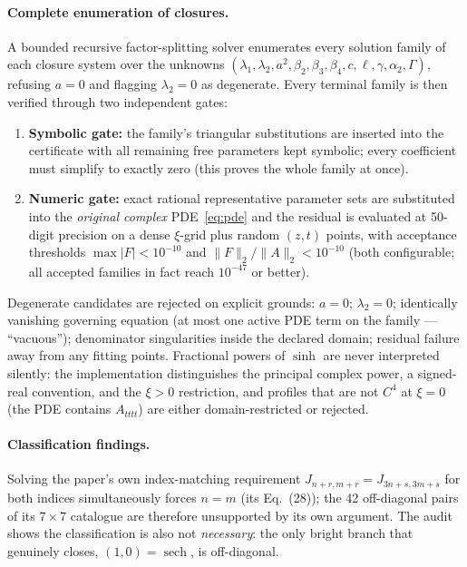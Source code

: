 \documentclass[11pt,a4paper]{article}
\begin{document}
\paragraph{Complete enumeration of closures.}
A bounded recursive factor-splitting solver enumerates every solution family
of each closure system over the unknowns
$(\lambda_1,\lambda_2,a^2,\beta_2,\beta_3,\beta_4,c,\ell,\gamma,\alpha_2,\Gamma)$,
refusing $a=0$ and flagging $\lambda_2=0$ as degenerate. Every terminal family
is then verified through two independent gates:
\begin{enumerate}
\item \textbf{Symbolic gate:} the family's triangular substitutions are
inserted into the certificate with all remaining free parameters kept
symbolic; every coefficient must simplify to exactly zero (this proves the
whole family at once).
\item \textbf{Numeric gate:} exact rational representative parameter sets are
substituted into the \emph{original complex} PDE~\eqref{eq:pde} and the
residual is evaluated at 50-digit precision on a dense $\xi$-grid plus random
$(z,t)$ points, with acceptance thresholds
$\max|F|<10^{-10}$ and $\|F\|_2/\|A\|_2<10^{-10}$ (both configurable; all
accepted families in fact reach $10^{-47}$ or better).
\end{enumerate}
Degenerate candidates are rejected on explicit grounds: $a=0$;
$\lambda_2=0$; identically vanishing governing equation (at most one active
PDE term on the family --- ``vacuous''); denominator singularities inside the
declared domain; residual failure away from any fitting points. Fractional
powers of $\sinh$ are never interpreted silently: the implementation
distinguishes the principal complex power, a signed-real convention, and the
$\xi>0$ restriction, and profiles that are not $C^4$ at $\xi=0$ (the PDE
contains $A_{tttt}$) are either domain-restricted or rejected.

\paragraph{Classification findings.}
Solving the paper's own index-matching requirement
$J_{n+r,m+r}=J_{3n+s,3m+s}$ for both indices simultaneously forces $n=m$
(its Eq.~(28)); the 42 off-diagonal pairs of its $7\times7$ catalogue are
therefore unsupported by its own argument. The audit shows the classification
is also not \emph{necessary}: the only bright branch that genuinely closes,
$(1,0)=\operatorname{sech}$, is off-diagonal.
\end{document}
